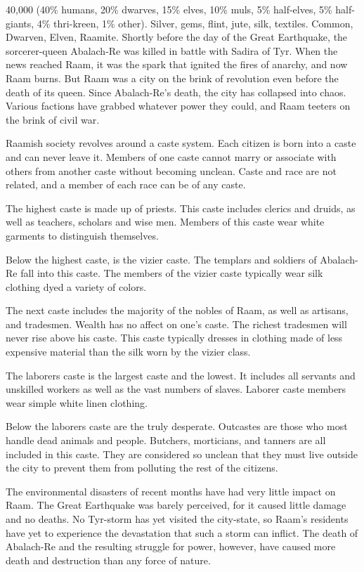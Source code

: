 {40,000 (40\% humans, 20\% dwarves, 15\% elves, 10\% muls, 5\% half-elves, 5\% half-giants, 4\% thri-kreen, 1\% other).}
{Silver, gems, flint, jute, silk, textiles.}
{Common, Dwarven, Elven, Raamite.}
{
	Shortly before the day of the Great Earthquake, the sorcerer-queen Abalach-Re was killed in battle with Sadira of Tyr. When the news reached Raam, it was the spark that ignited the fires of anarchy, and now Raam burns. But Raam was a city on the brink of revolution even before the death of its queen. Since Abalach-Re's death, the city has collapsed into chaos. Various factions have grabbed whatever power they could, and Raam teeters on the brink of civil war.
}
{
	Raamish society revolves around a caste system. Each citizen is born into a caste and can never leave it. Members of one caste cannot marry or associate with others from another caste without becoming unclean. Caste and race are not related, and a member of each race can be of any caste.

	The highest caste is made up of priests. This caste includes clerics and druids, as well as teachers, scholars and wise men. Members of this caste wear white garments to distinguish themselves.

	Below the highest caste, is the vizier caste. The templars and soldiers of Abalach-Re fall into this caste. The members of the vizier caste typically wear silk clothing dyed a variety of colors.

	The next caste includes the majority of the nobles of Raam, as well as artisans, and tradesmen. Wealth has no affect on one's caste. The richest tradesmen will never rise above his caste. This caste typically dresses in clothing made of less expensive material than the silk worn by the vizier class.

	The laborers caste is the largest caste and the lowest. It includes all servants and unskilled workers as well as the vast numbers of slaves. Laborer caste members wear simple white linen clothing.

	Below the laborers caste are the truly desperate. Outcastes are those who most handle dead animals and people. Butchers, morticians, and tanners are all included in this caste. They are considered so unclean that they must live outside the city to prevent them from polluting the rest of the citizens.

	The environmental disasters of recent months have had very little impact on Raam. The Great Earthquake was barely perceived, for it caused little damage and no deaths. No Tyr-storm has yet visited the city-state, so Raam's residents have yet to experience the devastation that such a storm can inflict. The death of Abalach-Re and the resulting struggle for power, however, have caused more death and destruction than any force of nature.

}
